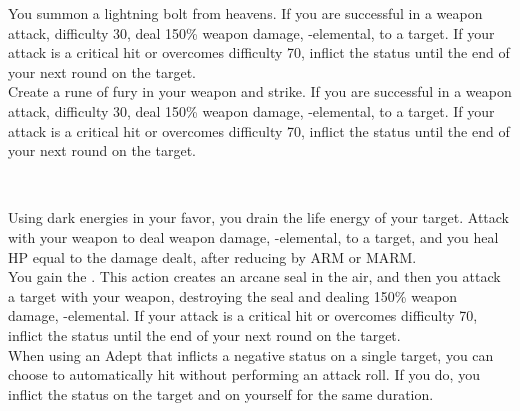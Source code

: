 \begin{tabjob}
         You summon a lightning bolt from heavens. If you are successful in a weapon attack, difficulty 30, deal 150\% weapon damage, -elemental, to a target. If your attack is a critical hit or overcomes difficulty 70, inflict the  status until the end of your next round on the target. \\

         Create a rune of fury in your weapon and strike. If you are successful in a weapon attack, difficulty 30, deal 150\% weapon damage, -elemental, to a target. If your attack is a critical hit or overcomes difficulty 70, inflict the  status until the end of your next round on the target. \\

    \tabjobsep%

    \\
    \tabjobspec{}

         Using dark energies in your favor, you drain the life energy of your target. Attack with your weapon to deal weapon damage, -elemental, to a target, and you heal HP equal to the damage dealt, after reducing by ARM or MARM\@. \\

         You gain the  . This action creates an arcane seal in the air, and then you attack a target with your weapon, destroying the seal and dealing 150\% weapon damage, -elemental. If your attack is a critical hit or overcomes difficulty 70, inflict the  status until the end of your next round on the target. \\

         When using an Adept  that inflicts a negative status on a single target, you can choose to automatically hit without performing an attack roll. If you do, you inflict the status on the target and on yourself for the same duration. \\


\end{tabjob}
